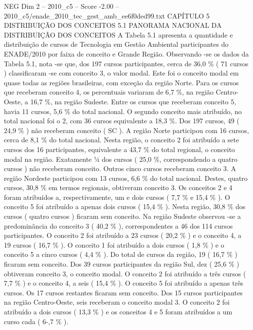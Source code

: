 \begin{textsample}{NEG Dim 2 – 2010\_c5 – Score -2.00 – 2010\_c5/enade\_2010\_tec\_gest\_amb\_ee6f0ded99.txt}  \label{ex:f2_neg_102}
CAPÍTULO 5 DISTRIBUIÇÃO DOS CONCEITOS 5.1 PANORAMA NACIONAL DA DISTRIBUIÇÃO DOS CONCEITOS A Tabela 5.1 apresenta a quantidade e distribuição de cursos de Tecnologia em Gestão Ambiental participantes do ENADE/2010 por faixa de conceito e Grande Região.
Observando -se os dados da Tabela 5.1, nota -se que, dos 197 cursos participantes, cerca de 36,0 \% ( 71 cursos ) classificaram -se com conceito 3, o valor modal.
Este foi o conceito modal em quase todas as regiões brasileiras, com exceção da região Norte.
Para os cursos que receberam conceito 4, os percentuais variaram de 6,7 \%, na região Centro-Oeste, a 16,7 \%, na região Sudeste.
Entre os cursos que receberam conceito 5, havia 11 cursos, 5,6 \% do total nacional.
O segundo conceito mais atribuído, no total nacional foi o 2, com 36 cursos equivalente a 18,3 \%.
Dos 197 cursos, 49 ( 24,9 \% ) não receberam conceito ( SC ).
A região Norte participou com 16 cursos, cerca de 8,1 \% do total nacional.
Nesta região, o conceito 2 foi atribuído a sete cursos dos 16 participantes, equivalente a 43,7 \% do total regional, o conceito modal na região.
Exatamente ¼ dos cursos ( 25,0 \%, correspondendo a quatro cursos ) não receberam conceito.
Outros cinco cursos receberam conceito 3.
A região Nordeste participou com 13 cursos, 6,6 \% do total nacional.
Destes, quatro cursos, 30,8 \% em termos regionais, obtiveram conceito 3.
Os conceitos 2 e 4 foram atribuídos a, respectivamente, um e dois cursos ( 7,7 \% e 15,4 \% ).
O conceito 5 foi atribuído a apenas dois cursos ( 15,4 \% ).
Nesta região, 30,8 \% dos cursos ( quatro cursos ) ficaram sem conceito.
Na região Sudeste observou -se a predominância do conceito 3 ( 40,2 \% ), correspondentes a 46 dos 114 cursos participantes.
O conceito 2 foi atribuído a 23 cursos ( 20,2 \% ) e o conceito 4, a 19 cursos ( 16,7 \% ).
O conceito 1 foi atribuído a dois cursos ( 1,8 \% ) e o conceito 5 a cinco cursos ( 4,4 \% ).
Do total de cursos da região, 19 ( 16,7 \% ) ficaram sem conceito.
Dos 39 cursos participantes da região Sul, dez ( 25,6 \% ) obtiveram conceito 3, o conceito modal.
O conceito 2 foi atribuído a três cursos ( 7,7 \% ) e o conceito 4, a seis ( 15,4 \% ).
O conceito 5 foi atribuído a apenas três cursos.
Os 17 cursos restantes ficaram sem conceito.
Dos 15 cursos participantes na região Centro-Oeste, seis receberam o conceito modal 3.
O conceito 2 foi atribuído a dois cursos ( 13,3 \% ) e os conceitos 4 e 5 foram atribuídos a um curso cada ( 6-,7 \% ).

\end{textsample}
